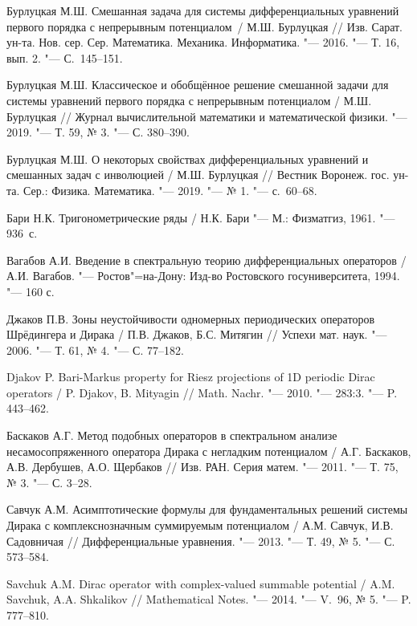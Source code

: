 \begin{thebibliography}{99}


 Бурлуцкая М.Ш. Смешанная задача для системы дифференциальных
уравнений первого порядка с непрерывным потенциалом~/ М.Ш. Бурлуцкая
// Изв. Сарат. ун-та. Нов. сер. Сер. Математика. Механика.
Информатика. "--- 2016. "--- Т. 16, вып. 2. "---  С.~145--151.

  Бурлуцкая М.Ш. Классическое и обобщённое  решение смешанной задачи для   системы уравнений первого порядка  с непрерывным потенциалом
/ М.Ш. Бурлуцкая // Журнал вычислительной математики и
математической физики. "--- 2019. "--- Т. 59, № 3. "--- С. 380--390.

 Бурлуцкая М.Ш. О некоторых свойствах дифференциальных уравнений и
смешанных задач  с инволюцией / М.Ш. Бурлуцкая //  Вестник Воронеж.
гос. ун-та. Сер.: Физика. Математика. "---   2019. "--- № 1. "---
с.~60--68.

   Бари Н.К. Тригонометрические ряды / Н.К. Бари  "--- М.: Физматгиз,  1961. "--- 936~с.


  Вагабов А.И. Введение в спектральную теорию дифференциальных  операторов / А.И. Вагабов. "---  Ростов"=на-Дону:
 Изд-во Ростовского госуниверситета, 1994. "--- 160 с.


  Джаков П.В.  Зоны неустойчивости одномерных  периодических операторов  Шрёдингера и Дирака / П.В. Джаков,  Б.С. Митягин
// Успехи мат. наук. "--- 2006. "--- Т. 61,  № 4. "--- С. 77--182.


 Djakov P.  Bari-Markus property for Riesz projections  of 1D periodic Dirac operators /  P. Djakov, B. Mityagin //
 Math. Nachr.  "--- 2010. "--- 283:3.  "--- P.  443--462.



  Баскаков А.Г. Метод подобных  операторов в спектральном анализе несамосопряженного оператора
 Дирака с негладким потенциалом / А.Г. Баскаков, А.В. Дербушев, А.О.  Щербаков // Изв. РАН. Серия матем.  "---  2011.  "---  Т.  75,  № 3.  "--- С. 3--28.



   Савчук А.М. Асимптотические формулы для фундаментальных решений  системы Дирака с комплекснозначным суммируемым потенциалом
 /  А.М. Савчук, И.В. Садовничая //  Дифференциальные уравнения. "--- 2013. "--- Т. 49, № 5. "--- С. 573--584.

 Savchuk A.M. Dirac operator with complex-valued summable  potential /  A.M. Savchuk, A.A. Shkalikov //  Mathematical Notes. "---
2014. "--- V.~96, № 5. "--- P. 777--810.


\end{thebibliography}
